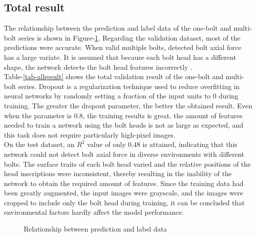 \documentclass{proc-a4}
\begin{document}
\subsection{Total result}
The relationship between the prediction and label data of the one-bolt and multi-bolt series is shown in Figure-\ref{fig-predicdata}. Regarding the validation dataset, most of the predictions were accurate. When valid multiple bolts, detected bolt axial force has a large variate. It is assumed that  because each bolt head has a different shape, the network detects the bolt head features incorrectly .\\
Table-\ref{tab-allresult} shows the total validation result of the one-bolt and multi-bolt series. Dropout is a regularization technique used to reduce overfitting in neural networks by randomly setting a fraction of the input units to 0 during training. The greater the dropout parameter, the better the obtained result.  Even when the parameter is 0.8, the training results is great. the amount of features needed to train a network using the bolt heads is not as large as expected, and this task does not require particularly high-pixel images.\\
On the test dataset, an $R^2$ value of only 0.48 is attained, indicating that this network could not detect bolt axial force in diverse environments with different bolts. The surface traits of each bolt head varied and the relative positions of the head inscriptions were inconsistent, thereby resulting in the inability of the network to obtain the required amount of features. Since the training data had been greatly augmented, the input images were grayscale, and the images were cropped to include only the bolt head during training, it can be concluded that environmental factors hardly affect the model performance. 

\begin{figure}
\centering
{}
    \caption{Relationship between prediction and label data}    \label{fig-predicdata}
\end{figure}
\end{document}
